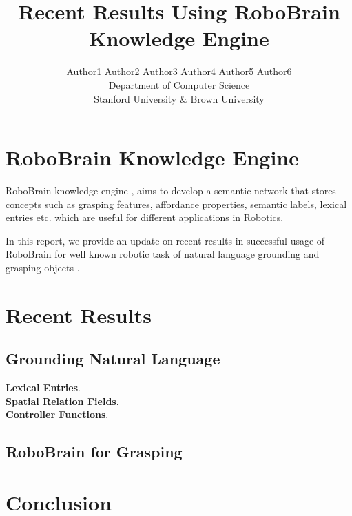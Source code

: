 \documentclass[11pt]{article}
\title{Recent Results Using RoboBrain Knowledge Engine}
\author{Author1 Author2 Author3 Author4 Author5 Author6\\Department of Computer Science\\Stanford University \& Brown University}
\begin{document}
\maketitle
\section{RoboBrain Knowledge Engine}
RoboBrain knowledge engine \cite{}, aims to develop a semantic network that stores concepts such as grasping features, affordance properties, semantic labels, lexical entries etc. which are useful for different applications in Robotics. 

In this report, we provide an update on recent results in successful usage of RoboBrain for well known robotic task of natural language grounding \cite{} and grasping objects \cite{}.

\section{Recent Results}

\subsection{Grounding Natural Language}
\textbf{Lexical Entries}.\\
\textbf{Spatial Relation Fields}.\\
\textbf{Controller Functions}.\\
\subsection{RoboBrain for Grasping}

\section{Conclusion}
\end{document}
